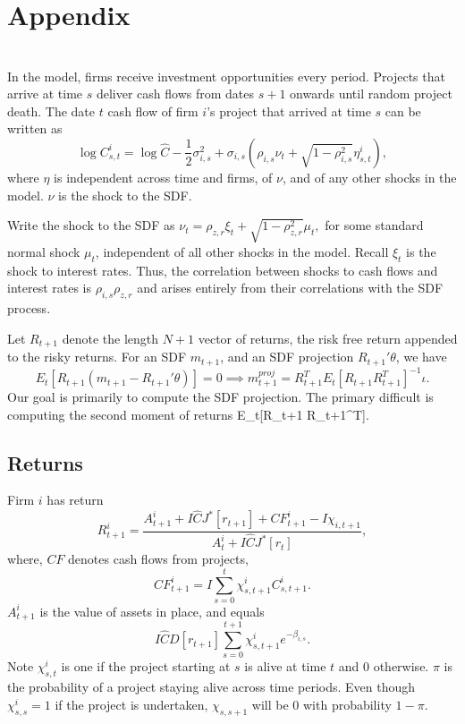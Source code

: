 
\clearpage
\appendix

\renewcommand{\thepage}{A.\arabic{page}}
\renewcommand{\theequation}{A.\arabic{equation}}
\renewcommand{\thefigure}{A.\arabic{figure}}
\renewcommand{\thetable}{A.\arabic{table}}
\setcounter{page}{1}
\setcounter{equation}{0}
\setcounter{figure}{0}
\setcounter{table}{0}

\section*{Appendix}

\section{\cite*{bgn}}

In the \cite{bgn} model, firms receive investment opportunities every period. Projects that arrive at time $s$ deliver cash flows from dates $s+1$ onwards until random project death. The date $t$ cash flow of firm $i$'s project that arrived at time $s$ can be written as \[
\log C_{s, t}^i = \log \hat C - \frac{1}{2} \sigma_{i, s}^2 +  \sigma_{i, s} (\rho_{i, s} \nu_{t} + \sqrt{1 - \rho_{i, s}^2} \eta_{s, t}^i),
\]
where $\eta$ is independent across time and firms, of $\nu$, and of any other shocks in the model. $\nu$ is the shock to the SDF. 

Write the shock to the SDF as $\nu_t = \rho_{z,r} \xi_t + \sqrt{1 - \rho_{z, r}^2} \mu_t,$ for some standard normal shock $\mu_t$, independent of all other shocks in the model. Recall $\xi_t$ is the shock to interest rates. Thus, the correlation between shocks to cash flows and interest rates is $\rho_{i, s} \rho_{z, r}$ and arises entirely from their correlations with the SDF process.

Let $R_{t+1}$ denote the length $N+1$ vector of returns, the risk free return appended to the risky returns.
For an SDF $m_{t+1}$, and an SDF projection $R_{t+1}' \theta$, we have\[
E_t[R_{t+1}(m_{t+1} - R_{t+1}' \theta)] = 0 \implies
m_{t+1}^{proj} = R_{t+1}^T E_t[R_{t+1} R_{t+1}^T]^{-1} \iota.
\]
Our goal is primarily to compute the SDF projection. The primary difficult is computing the second moment of returns  E_t[R_{t+1} R_{t+1}^T].

\subsection{Returns}
Firm $i$ has return \[
R_{t+1}^i = \frac{A_{t+1}^i + I \hat C J^*[r_{t+1}] + CF_{t+1}^i - I \chi_{i, t+1}}{A_{t}^i + I \hat C J^*[r_t]},
\]
where, $CF$ denotes cash flows from projects,
\[
CF_{t+1}^i  = I \sum_{s = 0}^t \chi_{s, t+1}^i C_{s, t+1}^i.
\]
$A_{t+1}^i$ is the value of assets in place, and equals 
\[
I \hat C D[r_{t+1}] \sum_{s = 0}^{t+1} \chi_{s, t+1}^i e^{- \beta_{i, s}}.
\]
Note $\chi_{s, t}^i$ is one if the project starting at $s$ is alive at time $t$ and 0 otherwise. $\pi$ is the probability of a project staying alive across time periods. Even though $\chi_{s, s}^i = 1$ if the project is undertaken, $\chi_{s, s+1}$ will be 0 with probability $1 - \pi$.

